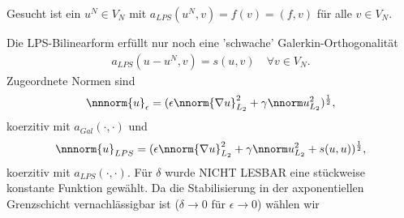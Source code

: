 Gesucht ist ein $u^{N} \in V_{N}$ mit $a_{LPS}(u^{N}, v) = f(v) = (f, v)$ für alle $v \in V_{N}$. 

Die LPS-Bilinearform erfüllt nur noch eine 'schwache' Galerkin-Orthogonalität
\begin{align*}
  a_{LPS}(u - u^{N}, v) = s(u, v) \quad \forall v \in V_{N}. 
\end{align*}
Zugeordnete Normen sind
\begin{align*}
  \nnnorm{u}_{\epsilon} = (\epsilon \nnorm{\nabla u}_{L_{2}}^{2} + \gamma \nnorm u_{L_{2}}^{2})^{\frac 12}, 
\end{align*}
koerzitiv mit $a_{Gal}(\cdot, \cdot)$ und 
\begin{align*}
    \nnnorm{u}_{LPS} = (\epsilon \nnorm{\nabla u}_{L_{2}}^{2} + \gamma \nnorm u_{L_{2}}^{2} + s(u, u))^{\frac 12}, 
\end{align*}
koerzitiv mit $a_{LPS}(\cdot, \cdot)$.
Für $\delta$ wurde 
NICHT LESBAR
eine stückweise konstante Funktion gewählt. 
Da die Stabilisierung in der axponentiellen Grenzschicht vernachlässigbar ist ($\delta \to 0$ für $\epsilon \to 0$) wählen wir

